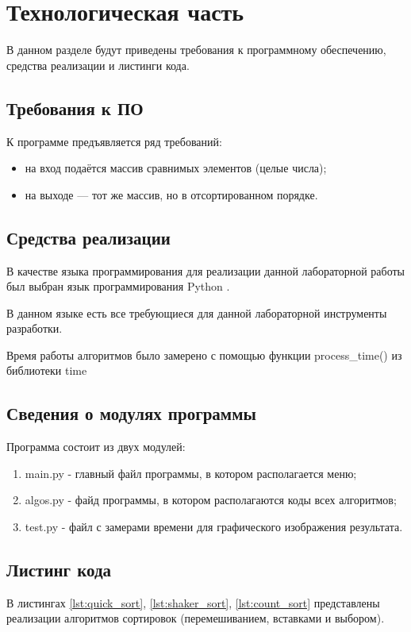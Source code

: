 \chapter{Технологическая часть}

В данном разделе будут приведены требования к программному обеспечению, средства реализации и листинги кода.

\section{Требования к ПО}

К программе предъявляется ряд требований:
\begin{itemize}
	\item на вход подаётся массив сравнимых элементов (целые числа);
	\item на выходе — тот же массив, но в отсортированном порядке.
\end{itemize}

\section{Средства реализации}

В качестве языка программирования для реализации данной лабораторной работы был выбран язык программирования Python \cite{pythonlang}. 

В данном языке есть все требующиеся для данной лабораторной инструменты разработки. 

Время работы алгоритмов было замерено с помощью функции process\_time() из библиотеки time \cite{pythonlangtime}

\section{Сведения о модулях программы}
Программа состоит из двух модулей:
\begin{enumerate}
	\item main.py - главный файл программы, в котором располагается меню;
	\item algos.py - файд программы, в котором располагаются коды всех алгоритмов;
	\item test.py - файл с замерами времени для графического изображения результата.
\end{enumerate}


\section{Листинг кода}
В листингах \ref{lst:quick_sort}, \ref{lst:shaker_sort}, \ref{lst:count_sort} представлены реализации алгоритмов сортировок (перемешиванием, вставками и выбором).

